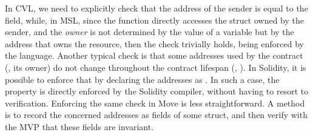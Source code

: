 %
In CVL, we need to explicitly check that the address of the sender is equal to the  field, while, in MSL, since the function directly accesses the  struct owned by the sender, and the \emph{owner} is not determined by the value of a variable %
but by the address that owns the resource,
then the check trivially holds, being enforced by the language. %
%
Another typical check is that some addresses used by the contract (\eg, its owner) do not change throughout the contract lifespan (\eg, ).
In Solidity, it is possible to enforce that by declaring the addresses as . 
In such a case, the property is directly enforced by the Solidity compiler, without having to resort to verification. 
%
Enforcing the same check in Move is less straightforward. A method is to record the concerned addresses as fields of some struct, and then verify with the MVP that these fields are invariant.





